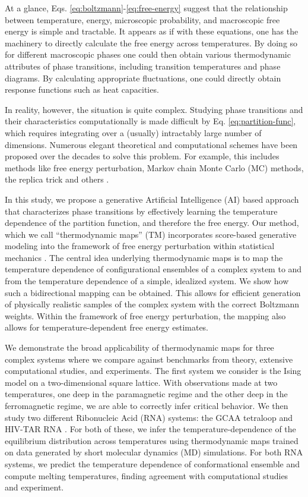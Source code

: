 \documentclass[9pt,twocolumn,twoside]{pnas-new}
\begin{document}
At a glance, Eqs. \ref{eq:boltzmann}-\ref{eq:free-energy} suggest that the relationship between temperature, energy, microscopic probability, and macroscopic free energy is simple and tractable. It appears as if with these equations, one has the machinery to directly calculate the free energy across temperatures. By doing so for different macroscopic phases one could then obtain various thermodynamic attributes of phase transitions, including transition temperatures and phase diagrams. By calculating appropriate fluctuations, one could directly obtain response functions such as heat capacities.

In reality, however, the situation is quite complex. Studying phase transitions and their characteristics computationally is made difficult by Eq. \ref{eq:partition-func}, which requires integrating over a (usually) intractably large number of dimensions. Numerous
elegant theoretical and computational schemes have been proposed over the decades to solve this problem. For example, this includes methods like free energy perturbation, Markov chain Monte Carlo (MC) methods,  the replica trick and others \cite{zwanzig-fep,monte-carlo-review,wham,bar,mbar,parisi-replica-trick}.

In this study, we propose a generative Artificial Intelligence (AI) based approach that characterizes phase transitions by effectively learning the temperature dependence of the partition function, and therefore the free energy. Our method, which we call ``thermodynamic maps'' (TM) incorporates score-based generative modeling into the framework of free energy perturbation within statistical mechanics \cite{nonequilibrium-learning,ddpm,sgm-sde,ddpm-remd}. The central idea underlying thermodynamic maps is to map the temperature dependence of configurational ensembles of a complex system to and from the temperature dependence of a simple, idealized system. We show how such a bidirectional mapping can be obtained. This allows for efficient generation of physically realistic samples of the complex system with the correct Boltzmann weights. Within the framework of free energy perturbation, the mapping also allows for temperature-dependent free energy estimates. 

We demonstrate the broad applicability of thermodynamic maps for three complex systems where we compare against benchmarks from theory, extensive computational studies, and experiments. The first system we consider is the Ising model on a two-dimensional square lattice. With observations made at two temperatures, one deep in the paramagnetic regime and the other deep in the ferromagnetic regime, we are able to correctly infer critical behavior. We then study two different Ribonucleic Acid (RNA) systems: the GCAA tetraloop and HIV-TAR RNA \cite{gcaa-nmr,hiv-nmr}. For both of these, we infer the temperature-dependence of the equilibrium distribution across temperatures using thermodynamic maps trained on data generated by short molecular dynamics (MD) simulations. For both RNA systems, we predict the temperature dependence of conformational ensemble and compute melting temperatures, finding agreement with computational studies and experiment.
\end{document}
